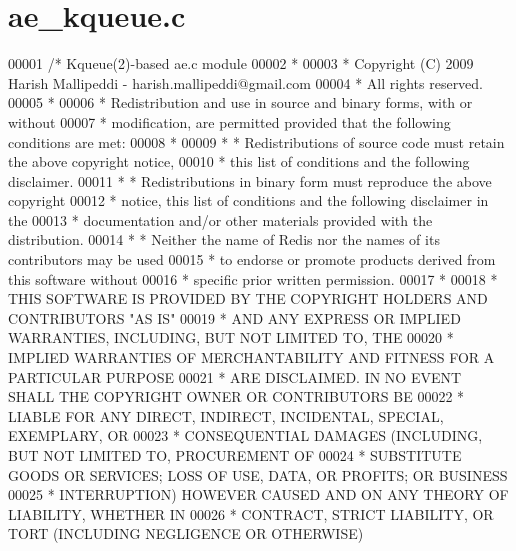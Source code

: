 \hypertarget{ae__kqueue_8c_source}{}\section{ae\+\_\+kqueue.\+c}
\label{ae__kqueue_8c_source}

\begin{DoxyCode}
00001 \textcolor{comment}{/* Kqueue(2)-based ae.c module}
00002 \textcolor{comment}{ *}
00003 \textcolor{comment}{ * Copyright (C) 2009 Harish Mallipeddi - harish.mallipeddi@gmail.com}
00004 \textcolor{comment}{ * All rights reserved.}
00005 \textcolor{comment}{ *}
00006 \textcolor{comment}{ * Redistribution and use in source and binary forms, with or without}
00007 \textcolor{comment}{ * modification, are permitted provided that the following conditions are met:}
00008 \textcolor{comment}{ *}
00009 \textcolor{comment}{ *   * Redistributions of source code must retain the above copyright notice,}
00010 \textcolor{comment}{ *     this list of conditions and the following disclaimer.}
00011 \textcolor{comment}{ *   * Redistributions in binary form must reproduce the above copyright}
00012 \textcolor{comment}{ *     notice, this list of conditions and the following disclaimer in the}
00013 \textcolor{comment}{ *     documentation and/or other materials provided with the distribution.}
00014 \textcolor{comment}{ *   * Neither the name of Redis nor the names of its contributors may be used}
00015 \textcolor{comment}{ *     to endorse or promote products derived from this software without}
00016 \textcolor{comment}{ *     specific prior written permission.}
00017 \textcolor{comment}{ *}
00018 \textcolor{comment}{ * THIS SOFTWARE IS PROVIDED BY THE COPYRIGHT HOLDERS AND CONTRIBUTORS "AS IS"}
00019 \textcolor{comment}{ * AND ANY EXPRESS OR IMPLIED WARRANTIES, INCLUDING, BUT NOT LIMITED TO, THE}
00020 \textcolor{comment}{ * IMPLIED WARRANTIES OF MERCHANTABILITY AND FITNESS FOR A PARTICULAR PURPOSE}
00021 \textcolor{comment}{ * ARE DISCLAIMED. IN NO EVENT SHALL THE COPYRIGHT OWNER OR CONTRIBUTORS BE}
00022 \textcolor{comment}{ * LIABLE FOR ANY DIRECT, INDIRECT, INCIDENTAL, SPECIAL, EXEMPLARY, OR}
00023 \textcolor{comment}{ * CONSEQUENTIAL DAMAGES (INCLUDING, BUT NOT LIMITED TO, PROCUREMENT OF}
00024 \textcolor{comment}{ * SUBSTITUTE GOODS OR SERVICES; LOSS OF USE, DATA, OR PROFITS; OR BUSINESS}
00025 \textcolor{comment}{ * INTERRUPTION) HOWEVER CAUSED AND ON ANY THEORY OF LIABILITY, WHETHER IN}
00026 \textcolor{comment}{ * CONTRACT, STRICT LIABILITY, OR TORT (INCLUDING NEGLIGENCE OR OTHERWISE)}

\end{DoxyCode}
